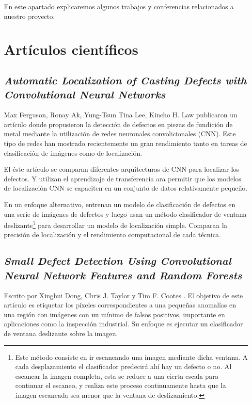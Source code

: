 
En este apartado explicaremos algunos trabajos y conferencias relacionados a nuestro proyecto.

\section{Artículos científicos}

\subsection{\textit{Automatic Localization of Casting Defects with Convolutional Neural Networks}}

Max Ferguson, Ronay Ak, Yung-Tsun Tina Lee, Kincho H. Law publicaron un artículo \cite{articulo:2} donde propusieron la detección de defectos en piezas de fundición de metal mediante la utilización de redes neuronales convolicionales (CNN). Este tipo de redes han mostrado recientemente un gran rendimiento tanto en tareas de clasificación de imágenes como de localización. 

El éste artículo se comparan diferentes arquitecturas de CNN para localizar los defectos. Y utilizan el aprendizaje de transferencia ara permitir que los modelos de localización CNN se capaciten en un conjunto de datos relativamente pequeño.

En un enfoque alternativo, entrenan un modelo de clasificación de defectos en una serie de imágenes de defectos y luego usan un método clasificador de ventana deslizante\footnote{Este método consiste en ir escaneando una imagen mediante dicha ventana. A cada desplazamiento el clasificador predecirá ahí hay un defecto o no. Al escanear la imagen completa, esta se reduce a una cierta escala para continuar el escaneo, y realiza este proceso continuamente hasta que la imagen escaneada sea menor que la ventana de deslizamiento.} para desarrollar un modelo de localización simple. Comparan la precisión de localización y el rendimiento computacional de cada técnica.

\subsection{\textit{Small Defect Detection Using Convolutional Neural Network Features and Random Forests}}

Escrito por Xinghui Dong, Chris J. Taylor y Tim F. Cootes \cite{articulo:1}. El objetivo de este artículo es etiquetar los píxeles correspondientes a una pequeñas anomalías en una región con imágenes con un mínimo de falsos positivos, importante en aplicaciones como la inspección industrial. Su enfoque es ejecutar un clasificador de ventana deslizante sobre la imagen. 

